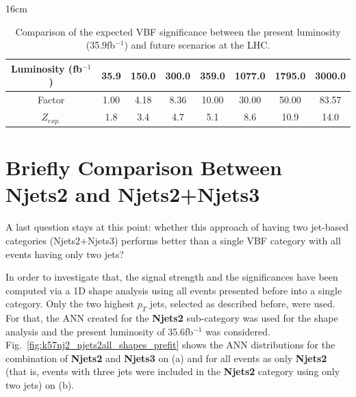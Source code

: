 \begin{table}[hbtp]{16cm}
	\caption{Comparison of the expected VBF significance between the present luminosity (35.9fb$^{-1}$) and future scenarios at the LHC.}
	\centering
	\begin{tabular}{c|c|c|c|c|c|c|c}
		\hline
		\rowcolor{light_gray}
		Luminosity (fb$^{-1}$) & 35.9 & 150.0 & 300.0 & 359.0 & 1077.0 & 1795.0 & 3000.0\\
		\hline
		\rowcolor{light_gray}
		Factor                 & 1.00 & 4.18  & 8.36  & 10.00 & 30.00  & 50.00  & 83.57\\
		\hline
		$Z_{exp.}$  & 1.8  & 3.4   & 4.7   & 5.1   & 8.6    & 10.9   & 14.0\\
		\hline
	\end{tabular}
	\label{tab:vbf_significance_vs_luminosities}
\end{table}


\section{Briefly Comparison Between Njets2 and Njets2+Njets3}
A last question stays at this point: whether this approach of having two jet-based categories (Njets2+Njets3) performs better than a single VBF category with all events having only two jets?

In order to investigate that, the signal strength and the significances have been computed via a 1D shape analysis using all events presented before into a single category. Only the two highest $p_{T}$ jets, selected as described before, were used. For that, the ANN created for the \textbf{Njets2} sub-category was used for the shape analysis and the present luminosity of 35.6fb$^{-1}$ was considered. Fig.~\ref{fig:k57nj2_njets2all_shapes_prefit} shows the ANN distributions for the combination of \textbf{Njets2} and \textbf{Njets3} on (a) and for all events as only \textbf{Njets2} (that is, events with three jets were included in the \textbf{Njets2} category using only two jets) on (b).

